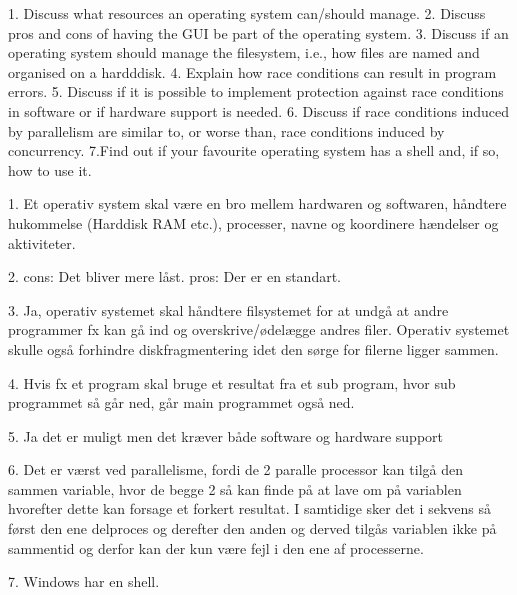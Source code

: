 1. Discuss what resources an operating system can/should manage.
2. Discuss pros and cons of having the GUI be part of the operating system.
3. Discuss if an operating system should manage the filesystem, i.e., how files are named and organised on a hardddisk.
4. Explain how race conditions can result in program errors.
5. Discuss if it is possible to implement protection against race conditions in software or if hardware support is needed.
6. Discuss if race conditions induced by parallelism are similar to, or worse than, race conditions induced by concurrency.
7.Find out if your favourite operating system has a shell and, if so, how to use it.

1. Et operativ system skal være en bro mellem hardwaren og softwaren, håndtere hukommelse (Harddisk RAM etc.), processer, navne og koordinere hændelser og aktiviteter. 

2. cons: Det bliver mere låst.
   pros: Der er en standart.
   
3. Ja, operativ systemet skal håndtere filsystemet for at undgå at andre programmer fx kan gå ind og overskrive/ødelægge andres filer. Operativ systemet skulle også forhindre diskfragmentering idet den sørge for filerne ligger sammen.

4. Hvis fx et program skal bruge et resultat fra et sub program, hvor sub programmet så går ned, går main programmet også ned.

5. Ja det er muligt men det kræver både software og hardware support

6. Det er værst ved parallelisme, fordi de 2 paralle processor kan tilgå den sammen variable, hvor de begge 2 så kan finde på at lave om på variablen hvorefter dette kan forsage et forkert resultat. I samtidige sker det i sekvens så først den ene delproces og derefter den anden og derved tilgås variablen ikke på sammentid og derfor kan der kun være fejl i den ene af processerne.

7. Windows har en shell.